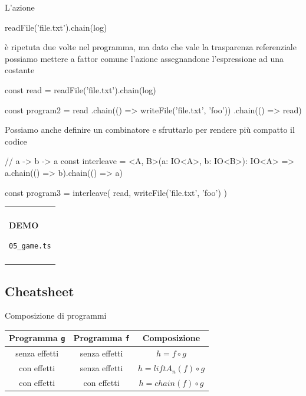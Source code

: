 \documentclass[12pt]{article}
\theoremstyle{definition}
\newenvironment{demo}
    {\begin{center}
    \begin{tabular}{|p{0.9\textwidth}|}
    \hline\\
    }
    {
    \\\\\hline
    \end{tabular}
    \end{center}
    }
\newenvironment{code}
  {\vspace{0.5cm} \VerbatimEnvironment\begin{typescriptcode}}
  {\end{typescriptcode} \vspace{0.2cm}}
\begin{document}
L'azione

\begin{code}
readFile('file.txt').chain(log)
\end{code}

è ripetuta due volte nel programma, ma dato che vale la trasparenza referenziale
possiamo mettere a fattor comune l'azione assegnandone l'espressione ad una costante

\begin{code}
const read = readFile('file.txt').chain(log)

const program2 = read
  .chain(() => writeFile('file.txt', 'foo'))
  .chain(() => read)
\end{code}

Possiamo anche definire un combinatore e sfruttarlo per rendere più compatto il codice

\begin{code}
// a -> b -> a
const interleave = <A, B>(a: IO<A>, b: IO<B>): IO<A> =>
  a.chain(() => b).chain(() => a)

const program3 = interleave(
  read,
  writeFile('file.txt', 'foo')
)
\end{code}

\begin{demo}
\begin{center}
\textbf{DEMO}

\texttt{05\_game.ts}
\end{center}
\end{demo}

\newpage
\subsection{Cheatsheet}

Composizione di programmi

\begin{center}
\bgroup
\def\arraystretch{1.5}
\begin{tabular}{ |c|c|c| }
\hline
Programma \texttt{g} & Programma \texttt{f} & Composizione \\
\hline
senza effetti & senza effetti & $h = f \circ g$ \\
\hline
con effetti & senza effetti & $h = liftA_n(f) \circ g$ \\
\hline
con effetti & con effetti & $h = chain(f) \circ g$ \\
\hline
\end{tabular}
\egroup
\end{center}
\end{document}
